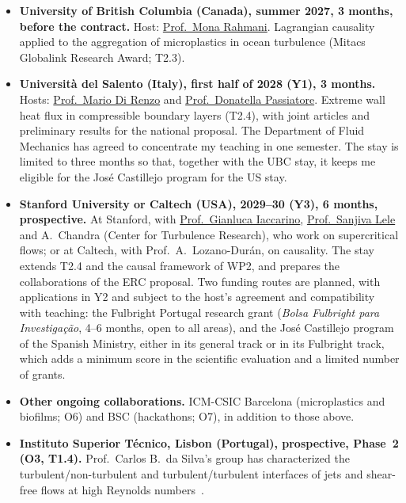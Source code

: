 \documentclass[11pt]{article}
\begin{document}
\begin{itemize}
  \item \textbf{University of British Columbia (Canada), summer 2027, 3 months, before the
  contract.} Host: \href{https://chbe.ubc.ca/mona-rahmani/}{Prof.\ Mona Rahmani}. Lagrangian
  causality applied to the aggregation of microplastics in ocean turbulence (Mitacs Globalink
  Research Award; T2.3).
  \item \textbf{Universit\`a del Salento (Italy), first half of 2028 (Y1), 3 months.} Hosts:
  \href{https://www.unisalento.it/scheda-utente/-/people/mario.direnzo}{Prof.\ Mario Di Renzo}
  and \href{https://www.unisalento.it/scheda-utente/-/people/donatella.passiatore}{Prof.\
  Donatella Passiatore}. Extreme wall heat flux in compressible boundary layers (T2.4), with
  joint articles and preliminary results for the national proposal. The Department of Fluid
  Mechanics has agreed to concentrate my teaching in one semester. The stay is limited to
  three months so that, together with the UBC stay, it keeps me eligible for the José
  Castillejo program for the US stay.
  \item \textbf{Stanford University or Caltech (USA), 2029--30 (Y3), 6 months,
  prospective.} At Stanford, with
  \href{https://me.stanford.edu/people/gianluca-iaccarino}{Prof.\ Gianluca Iaccarino},
  \href{https://me.stanford.edu/people/sanjiva-lele}{Prof.\ Sanjiva Lele} and A.\ Chandra
  (Center for Turbulence Research), who work on supercritical flows; or at Caltech, with
  Prof.\ A.\ Lozano-Dur\'an, on causality. The stay extends T2.4 and the causal framework of
  WP2, and prepares the collaborations of the ERC proposal. Two funding routes are planned,
  with applications in Y2 and subject to the host's agreement and compatibility with
  teaching: the Fulbright Portugal research grant (\emph{Bolsa Fulbright para
  Investiga\c{c}\~ao}, 4--6 months, open to all areas), and the José Castillejo program of the
  Spanish Ministry, either in its general track or in its Fulbright track, which adds a minimum
  score in the scientific evaluation and a limited number of grants.
  \item \textbf{Other ongoing collaborations.} ICM-CSIC Barcelona (microplastics and biofilms;
  O6) and BSC (hackathons; O7), in addition to those above.
  \item \textbf{Instituto Superior T\'ecnico, Lisbon (Portugal), prospective, Phase~2 (O3,
  T1.4).} Prof.\ Carlos B.\ da Silva's group has characterized the turbulent/non-turbulent and turbulent/turbulent
  interfaces of jets and shear-free flows at high Reynolds numbers~\cite{Silva2018,Alves2025}.

\end{itemize}
\end{document}
